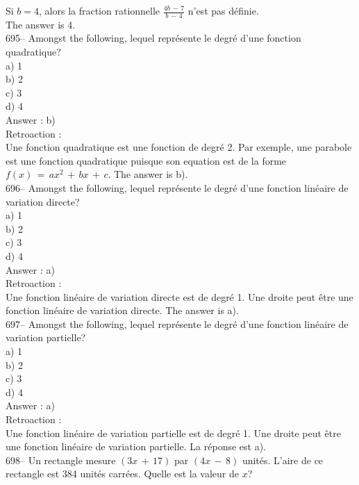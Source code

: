 ﻿\documentclass[letterpaper, 12pt]{article}
\begin{document}
Si $b=4$, alors la fraction rationnelle $\frac{4b\,-\,7}{b\,-\,4}$ n'est pas
d\'efinie.\\
The answer is 4.\\

695-- Amongst the following, lequel repr\'esente le degr\'e d'une
fonction quadratique?\\
a) 1\\
b) 2\\
c) 3\\
d) 4\\

Answer : b)\\

Retroaction : \\
Une fonction quadratique est une fonction de degr\'e 2.  Par exemple, une
parabole est une fonction quadratique puisque son equation est de la forme
$f(x)\,=\,ax^2 \,+\, bx \,+\, c$.  The answer is b).\\

696-- Amongst the following, lequel repr\'esente le degr\'e d'une
fonction lin\'eaire de variation directe?\\
a) 1\\
b) 2\\
c) 3\\
d) 4\\

Answer : a)\\

Retroaction : \\
Une fonction lin\'eaire de variation directe est de degr\'e 1.  Une droite
peut \^etre une fonction lin\'eaire de variation directe.  The answer is
a).\\

697-- Amongst the following, lequel repr\'esente le degr\'e d'une
fonction lin\'eaire de variation partielle?\\
a) 1\\
b) 2\\
c) 3\\
d) 4\\

Answer : a)\\

Retroaction : \\
Une fonction lin\'eaire de variation partielle est de degr\'e 1.  Une droite
peut \^etre une fonction lin\'eaire de variation partielle.  La r\'eponse
est a).\\

698-- Un rectangle mesure $(3x\,+\,17)$ par $(4x\,-\,8)$ unit\'es.  L'aire
de ce rectangle est 384 unit\'es carr\'ees.  Quelle est la valeur de $x$?\\
\end{document}
